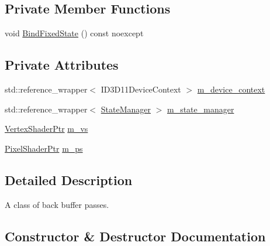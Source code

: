 \subsection*{Private Member Functions}
\begin{DoxyCompactItemize}
\item 
void \hyperlink{classmage_1_1rendering_1_1_back_buffer_pass_a45aafe0681a6e0598d088dbf3954cfb7}{Bind\+Fixed\+State} () const noexcept
\end{DoxyCompactItemize}
\subsection*{Private Attributes}
\begin{DoxyCompactItemize}
\item 
std\+::reference\+\_\+wrapper$<$ I\+D3\+D11\+Device\+Context $>$ \hyperlink{classmage_1_1rendering_1_1_back_buffer_pass_ae87c0cf8b2ffe627ac44faaf61791b4f}{m\+\_\+device\+\_\+context}
\item 
std\+::reference\+\_\+wrapper$<$ \hyperlink{classmage_1_1rendering_1_1_state_manager}{State\+Manager} $>$ \hyperlink{classmage_1_1rendering_1_1_back_buffer_pass_a5d10a44c5f8a3529d64aabfb590156f2}{m\+\_\+state\+\_\+manager}
\item 
\hyperlink{namespacemage_1_1rendering_aaf704b9c54a4181f4950a1761de69dda}{Vertex\+Shader\+Ptr} \hyperlink{classmage_1_1rendering_1_1_back_buffer_pass_a12a95cc800090a0bc01d14a9f5903748}{m\+\_\+vs}
\item 
\hyperlink{namespacemage_1_1rendering_af03d922b228ee9c8542baaa2ecc9f259}{Pixel\+Shader\+Ptr} \hyperlink{classmage_1_1rendering_1_1_back_buffer_pass_a46bc7e8b3636db2eb84b42590b7bd51e}{m\+\_\+ps}
\end{DoxyCompactItemize}


\subsection{Detailed Description}
A class of back buffer passes. 

\subsection{Constructor \& Destructor Documentation}
\hypertarget{classmage_1_1rendering_1_1_back_buffer_pass_a054aad27e4b3d05baf235ae256934ef2}{}\label{classmage_1_1rendering_1_1_back_buffer_pass_a054aad27e4b3d05baf235ae256934ef2} 
